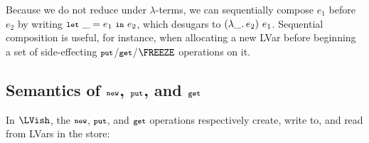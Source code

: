 

Because we do not reduce under $\lambda$-terms, we can sequentially
compose $e_1$ before $e_2$ by writing $\letexp{\_}{e_1}{e_2}$, which
desugars to $\app{(\lam{\_}{e_2})}{e_1}$.  Sequential composition is
useful, for instance, when allocating a new LVar before beginning a
set of side-effecting $\PUT$/$\GET$/$\FREEZE$ operations on it.

\subsection{Semantics of $\NEW$, $\PUT$, and $\GET$}\label{subsection:newputget}

In $\LVish$, the $\NEW$, $\PUT$, and $\GET$ operations respectively create,
write to, and read from LVars in the store:

